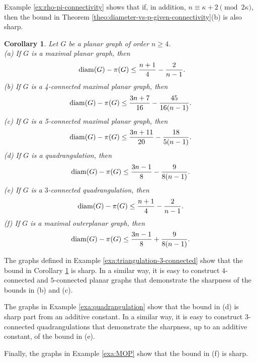 \documentclass[a4paper,11pt]{article}
\newtheorem{corollary}[theorem]%
{Corollary}
\begin{document}
Example \ref{ex:rho-pi-connectivity} shows that if, in addition,
$n \equiv \kappa+2 \pmod{2\kappa}$, then the bound in 
Theorem \ref{theo:diameter-vs-p-given-connectivity}(b) is also sharp. 











\begin{corollary}\label{coro:diam-vs-proximity}
Let \( G \) be a planar graph of order \( n \geq 4 \).  \\[1mm]
(a) If $G$ is a maximal planar graph, then
\[
\ {\rm diam}(G)- \pi(G) \leq \frac{n+1}{4}-\frac{2}{n-1}.
\]
(b) If $G$ is a 4-connected maximal planar graph, then
\[
{\rm diam}(G)- \pi(G) \leq \frac{3n+7}{16} - \frac{45}{16(n-1)}.
\]
(c) If $G$ is a 5-connected maximal planar graph, then
\[
{\rm diam}(G) - \pi(G) \leq \frac{3n+11}{20} - \frac{18}{5(n-1)}.
\]
(d) If $G$ is a quadrangulation, then
\[
{\rm diam}(G) - \pi(G) \leq \frac{3n-1}{8} - \frac{9}{8(n-1)}.
\]
(e) If $G$ is a $3$-connected quadrangulation, then
\[
{\rm diam}(G) - \pi(G) \leq \frac{n+1}{4} - \frac{2}{n-1}.
\]
(f) If $G$ is a maximal outerplanar graph, then
\[
{\rm diam}(G) - \pi(G) \leq \frac{3n-1}{8} + \frac{9}{8(n-1)}.
\]
\end{corollary}

The graphs defined in Example \ref{exa:triangulation-3-connected} show that the bound in
Corollary \ref{coro:diam-vs-proximity} is sharp. In a similar way, it is easy to construct
$4$-connected and $5$-connected planar graphs that demonstrate the sharpness of the bounds 
in (b) and (c).

The graphs in Example \ref{exa:quadrangulation} show that the bound in (d) is sharp part from an additive constant. 
In a similar way, it is easy to construct $3$-connected quadrangulations that demonstrate 
the sharpness, up to an additive constant, of the bound in (e).

Finally, the graphs in Example \ref{exa:MOP} show that the bound in (f) is sharp. 





 
\end{document}
